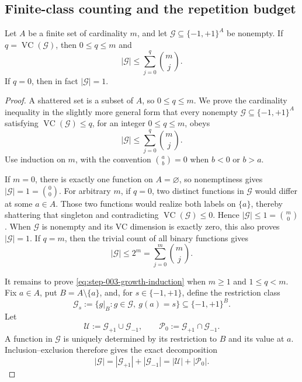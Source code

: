 \subsection{Finite-class counting and the repetition budget}
\label{app:step-003}

\begin{lemma}
\label{lem:step-003-growth}
Let $A$ be a finite set of cardinality $m$, and let
$\mathcal G\subseteq\{-1,+1\}^{A}$ be nonempty.  If
$q=\operatorname{VC}(\mathcal G)$, then $0\leq q\leq m$ and
\[
|\mathcal G|\leq\sum_{j=0}^{q}\binom mj.
\]
If $q=0$, then in fact $|\mathcal G|=1$.
\end{lemma}

\begin{proof}
A shattered set is a subset of $A$, so $0\leq q\leq m$.  We prove the
cardinality inequality in the slightly more general form that every nonempty
$\mathcal G\subseteq\{-1,+1\}^{A}$ satisfying
$\operatorname{VC}(\mathcal G)\leq q$, for an integer $0\leq q\leq m$,
obeys
\begin{equation}
|\mathcal G|\leq\sum_{j=0}^{q}\binom mj.
\label{eq:step-003-growth-induction}
\end{equation}
Use induction on $m$, with the convention $\binom ab=0$ when $b<0$ or
$b>a$.

If $m=0$, there is exactly one function on $A=\varnothing$, so nonemptiness
gives $|\mathcal G|=1=\binom00$.  For arbitrary $m$, if $q=0$, two
distinct functions in $\mathcal G$ would differ at some $a\in A$.  Those two
functions would realize both labels on $\{a\}$, thereby shattering that
singleton and contradicting $\operatorname{VC}(\mathcal G)\leq0$.  Hence
$|\mathcal G|\leq1=\binom m0$.  When $\mathcal G$ is nonempty and its VC
dimension is exactly zero, this also proves $|\mathcal G|=1$.  If $q=m$,
then the trivial count of all binary functions gives
\[
|\mathcal G|\leq2^m=\sum_{j=0}^{m}\binom mj.
\]

It remains to prove \eqref{eq:step-003-growth-induction} when $m\geq1$ and
$1\leq q<m$.  Fix $a\in A$, put $B=A\setminus\{a\}$, and, for
$s\in\{-1,+1\}$, define the restriction class
\[
\mathcal G_s:=\{g|_B:g\in\mathcal G,\ g(a)=s\}
\subseteq\{-1,+1\}^{B}.
\]
Let
\[
\mathcal U:=\mathcal G_{+1}\cup\mathcal G_{-1},
\qquad
\mathcal P_0:=\mathcal G_{+1}\cap\mathcal G_{-1}.
\]
A function in $\mathcal G$ is uniquely determined by its restriction to $B$
and its value at $a$.  Inclusion--exclusion therefore gives the exact
decomposition
\begin{equation}
|\mathcal G|
=|\mathcal G_{+1}|+|\mathcal G_{-1}|
=|\mathcal U|+|\mathcal P_0|.
\label{eq:step-003-decomposition}
\end{equation}


\end{proof}
